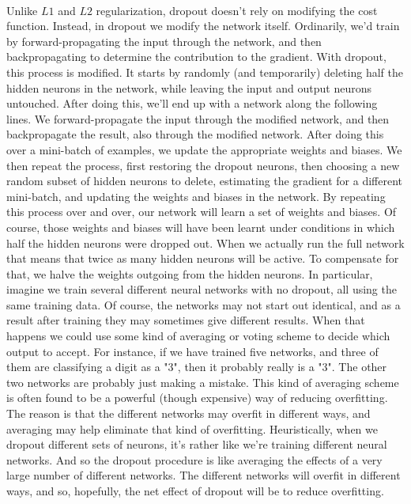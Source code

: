 \paragraph{} Unlike $L1$ and $L2$ regularization, dropout doesn't rely on modifying the cost function. Instead, in dropout we modify the network itself. Ordinarily, we'd train by forward-propagating the input through the network, and then backpropagating to determine the contribution to the gradient. With dropout, this process is modified. It starts by randomly (and temporarily) deleting half the hidden neurons in the network, while leaving the input and output neurons untouched. After doing this, we'll end up with a network along the following lines. We forward-propagate the input through the modified network, and then backpropagate the result, also through the modified network. After doing this over a mini-batch of examples, we update the appropriate weights and biases. We then repeat the process, first restoring the dropout neurons, then choosing a new random subset of hidden neurons to delete, estimating the gradient for a different mini-batch, and updating the weights and biases in the network. By repeating this process over and over, our network will learn a set of weights and biases. Of course, those weights and biases will have been learnt under conditions in which half the hidden neurons were dropped out. When we actually run the full network that means that twice as many hidden neurons will be active. To compensate for that, we halve the weights outgoing from the hidden neurons. In particular, imagine we train several different neural networks with no dropout, all using the same training data. Of course, the networks may not start out identical, and as a result after training they may sometimes give different results. When that happens we could use some kind of averaging or voting scheme to decide which output to accept. For instance, if we have trained five networks, and three of them are classifying a digit as a "3", then it probably really is a "3". The other two networks are probably just making a mistake. This kind of averaging scheme is often found to be a powerful (though expensive) way of reducing overfitting. The reason is that the different networks may overfit in different ways, and averaging may help eliminate that kind of overfitting. Heuristically, when we dropout different sets of neurons, it's rather like we're training different neural networks. And so the dropout procedure is like averaging the effects of a very large number of different networks. The different networks will overfit in different ways, and so, hopefully, the net effect of dropout will be to reduce overfitting.

